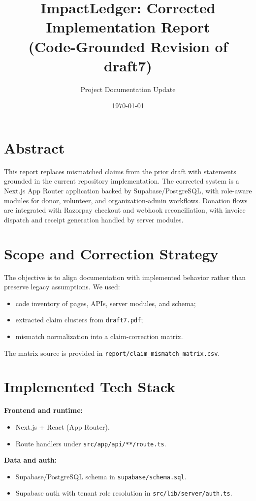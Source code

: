 \documentclass[12pt,a4paper]{article}
\title{ImpactLedger: Corrected Implementation Report\\\large(Code-Grounded Revision of draft7)}
\author{Project Documentation Update}
\date{\today}
\begin{document}
\maketitle

\section*{Abstract}
This report replaces mismatched claims from the prior draft with statements grounded in the current repository implementation. The corrected system is a Next.js App Router application backed by Supabase/PostgreSQL, with role-aware modules for donor, volunteer, and organization-admin workflows. Donation flows are integrated with Razorpay checkout and webhook reconciliation, with invoice dispatch and receipt generation handled by server modules.

\section{Scope and Correction Strategy}
The objective is to align documentation with implemented behavior rather than preserve legacy assumptions. We used:
\begin{itemize}
  \item code inventory of pages, APIs, server modules, and schema;
  \item extracted claim clusters from \texttt{draft7.pdf};
  \item mismatch normalization into a claim-correction matrix.
\end{itemize}

The matrix source is provided in \texttt{report/claim\_mismatch\_matrix.csv}.

\section{Implemented Tech Stack}
\textbf{Frontend and runtime:}
\begin{itemize}
  \item Next.js + React (App Router).
  \item Route handlers under \texttt{src/app/api/**/route.ts}.
\end{itemize}

\textbf{Data and auth:}
\begin{itemize}
  \item Supabase/PostgreSQL schema in \texttt{supabase/schema.sql}.
  \item Supabase auth with tenant role resolution in \texttt{src/lib/server/auth.ts}.
\end{itemize}
\end{document}
